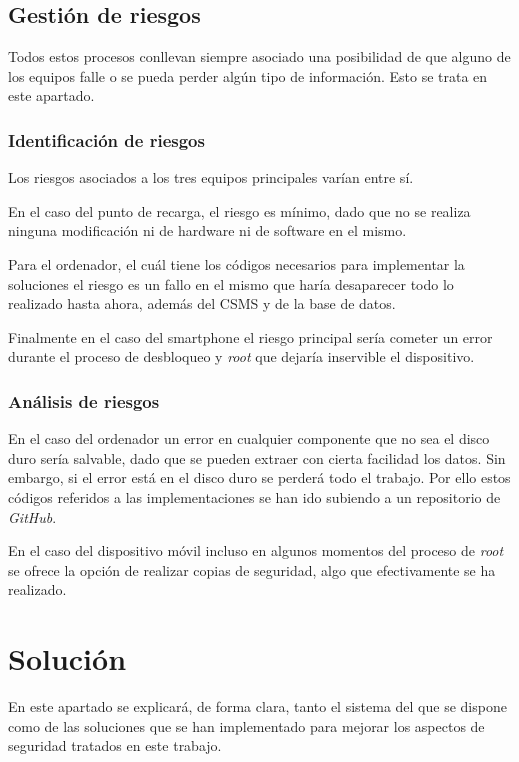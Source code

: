 \documentclass[12pt,a4paper,onecolumn,oneside]{report}
\begin{document}
\section{Gestión de riesgos}

Todos estos procesos conllevan siempre asociado una posibilidad de que alguno de los equipos falle o se pueda perder algún tipo de información. Esto se trata en este apartado.

\subsection{Identificación de riesgos}

Los riesgos asociados a los tres equipos principales varían entre sí. 

En el caso del punto de recarga, el riesgo es mínimo, dado que no se realiza ninguna modificación ni de hardware ni de software en el mismo.

Para el ordenador, el cuál tiene los códigos necesarios para implementar la soluciones el riesgo es un fallo en el mismo que haría desaparecer todo lo realizado hasta ahora, además del CSMS y de la base de datos. 

Finalmente en el caso del smartphone el riesgo principal sería cometer un error durante el proceso de desbloqueo y \textit{root} que dejaría inservible el dispositivo.

\subsection{Análisis de riesgos}

En el caso del ordenador un error en cualquier componente que no sea el disco duro sería salvable, dado que se pueden extraer con cierta facilidad los datos. Sin embargo, si el error está en el disco duro se perderá todo el trabajo. Por ello estos códigos referidos a las implementaciones se han ido subiendo a un repositorio de \textit{GitHub}.

En el caso del dispositivo móvil incluso en algunos momentos del proceso de \textit{root} se ofrece la opción de realizar copias de seguridad, algo que efectivamente se ha realizado.


\chapter{Solución}
\label{Solución}

En este apartado se explicará, de forma clara, tanto el sistema del que se dispone como de las soluciones que se han implementado para mejorar los aspectos de seguridad tratados en este trabajo. 
\end{document}
